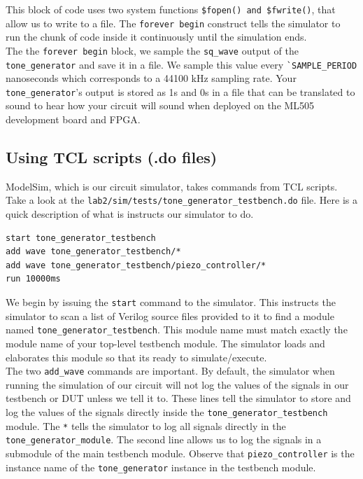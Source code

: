 \documentclass[11pt]{article}
\begin{document}
This block of code uses two system functions \verb|$fopen() and $fwrite()|, that allow us to write to a file. The \verb|forever begin| construct tells the simulator to run the chunk of code inside it continuously until the simulation ends.\\

The the \verb|forever begin| block, we sample the \verb|sq_wave| output of the \verb|tone_generator| and save it in a file. We sample this value every \verb|`SAMPLE_PERIOD| nanoseconds which corresponds to a 44100 kHz sampling rate. Your \verb|tone_generator|'s output is stored as 1s and 0s in a file that can be translated to sound to hear how your circuit will sound when deployed on the ML505 development board and FPGA.

\subsection{Using TCL scripts (.do files)}

ModelSim, which is our circuit simulator, takes commands from TCL scripts. Take a look at the \verb|lab2/sim/tests/tone_generator_testbench.do| file. Here is a quick description of what is instructs our simulator to do.

\begin{verbatim}
start tone_generator_testbench
add wave tone_generator_testbench/*
add wave tone_generator_testbench/piezo_controller/*
run 10000ms
\end{verbatim}

We begin by issuing the \verb|start| command to the simulator. This instructs the simulator to scan a list of Verilog source files provided to it to find a module named \verb|tone_generator_testbench|. This module name must match exactly the module name of your top-level testbench module. The simulator loads and elaborates this module so that its ready to simulate/execute.\\

The two \verb|add_wave| commands are important. By default, the simulator when running the simulation of our circuit will not log the values of the signals in our testbench or DUT unless we tell it to. These lines tell the simulator to store and log the values of the signals directly inside the \verb|tone_generator_testbench| module. The \verb|*| tells the simulator to log all signals directly in the \verb|tone_generator_module|. The second line allows us to log the signals in a submodule of the main testbench module. Observe that \verb|piezo_controller| is the instance name of the \verb|tone_generator| instance in the testbench module.\\
\end{document}
